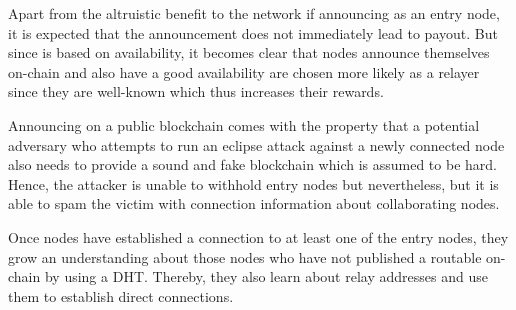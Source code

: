 \begin{figure}[H]
\end{figure}

Apart from the altruistic benefit to the network if announcing as an entry node, it is expected that the announcement does not immediately lead to payout. But since  is based on availability, it becomes clear that nodes announce themselves on-chain and also have a good availability are chosen more likely as a relayer since they are well-known which thus increases their rewards.

Announcing on a public blockchain comes with the property that a potential adversary who attempts to run an eclipse attack against a newly connected node also needs to provide a sound and fake blockchain which is assumed to be hard. Hence, the attacker is unable to withhold entry nodes but nevertheless, but it is able to spam the victim with connection information about collaborating nodes.

Once nodes have established a connection to at least one of the entry nodes, they grow an understanding about those nodes who have not published a routable on-chain by using a DHT. Thereby, they also learn about relay addresses and use them to establish direct connections.